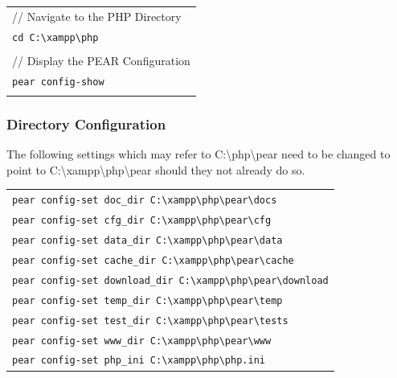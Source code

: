 \documentclass[]{report}
\begin{document}
\begin{tabular}{l}
// Navigate to the PHP Directory\\
\texttt{cd C:\textbackslash xampp\textbackslash php}\\
\\
// Display the PEAR Configuration\\
\texttt{pear config-show} \\
\\
\end{tabular} 

\subsubsection{Directory Configuration}

The following settings which may refer to C:\textbackslash php\textbackslash pear need to be changed to point to C:\textbackslash xampp\textbackslash php\textbackslash pear should they not already do so.\\

\begin{tabular}{l}
\texttt{pear config-set doc\_dir C:\textbackslash xampp\textbackslash php\textbackslash pear\textbackslash docs} \\
\texttt{pear config-set cfg\_dir C:\textbackslash xampp\textbackslash php\textbackslash pear\textbackslash cfg} \\
\texttt{pear config-set data\_dir C:\textbackslash xampp\textbackslash php\textbackslash pear\textbackslash data} \\
\texttt{pear config-set cache\_dir C:\textbackslash xampp\textbackslash php\textbackslash pear\textbackslash cache} \\
\texttt{pear config-set download\_dir C:\textbackslash xampp\textbackslash php\textbackslash pear\textbackslash download} \\
\texttt{pear config-set temp\_dir C:\textbackslash xampp\textbackslash php\textbackslash pear\textbackslash temp} \\
\texttt{pear config-set test\_dir C:\textbackslash xampp\textbackslash php\textbackslash pear\textbackslash tests} \\
\texttt{pear config-set www\_dir C:\textbackslash xampp\textbackslash php\textbackslash pear\textbackslash www} \\
\texttt{pear config-set php\_ini C:\textbackslash xampp\textbackslash php\textbackslash php.ini}
\end{tabular}

\newpage
\end{document}
